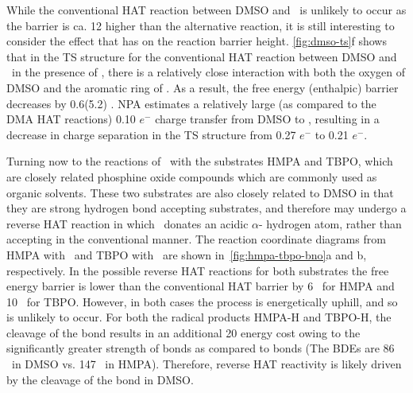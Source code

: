 While the conventional HAT reaction between DMSO and \bno\ is unlikely to occur
as the barrier is ca. 12 \kcalmol higher than the alternative reaction, it is
still interesting to consider the effect that  has on the reaction
barrier height. \ref{fig:dmso-ts}f shows that in the TS structure for the
conventional HAT reaction between DMSO and \bno\ in the presence of ,
there is a relatively close interaction with both the oxygen of DMSO and the
aromatic ring of \bno. As a result, the free energy (enthalpic) barrier
decreases by 0.6(5.2) \kcalmol. NPA estimates a relatively large (as compared
to the DMA HAT reactions) 0.10 $e^-$ charge transfer from DMSO to ,
resulting in a decrease in charge separation in the TS structure from 0.27
$e^-$ to 0.21 $e^-$.

Turning now to the reactions of \bno\ with the substrates HMPA and TBPO, which
are closely related phosphine oxide compounds which are commonly used as
organic solvents. These two substrates are also closely related to DMSO in that
they are strong hydrogen bond accepting substrates, and therefore may undergo a
reverse HAT reaction in which \bno\ donates an acidic $\alpha$-
hydrogen atom, rather than accepting in the conventional manner. The reaction
coordinate diagrams from HMPA with \bno\ and TBPO with \bno\ are shown
in~\ref{fig:hmpa-tbpo-bno}a and b, respectively. In the possible reverse HAT
reactions for both substrates the free energy barrier is lower than the
conventional HAT barrier by 6 \kcalmol\ for HMPA and 10 \kcalmol\ for TBPO.
However, in both cases the process is energetically uphill, and so is unlikely
to occur. For both the radical products HMPA-H and TBPO-H, the cleavage of the
 bond results in an additional 20 \kcalmol energy cost owing to the
significantly greater strength of  bonds as compared to  bonds
(The BDEs are 86 \kcalmol\ in DMSO vs. 147 \kcalmol\ in
HMPA). Therefore, reverse HAT
reactivity is likely driven by the cleavage of the  bond in DMSO.

